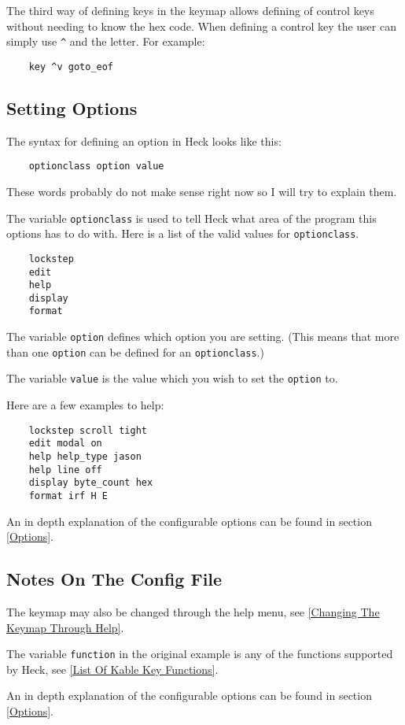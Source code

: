 \documentclass[12pt]{article}
\begin{document}
The third way of defining keys in the keymap allows defining of control keys
without needing to know the hex code.  When defining a control key the user
can simply use \verb#^# and the letter.  For example:
\begin{verbatim}
    key ^v goto_eof 
\end{verbatim}

\subsection{Setting Options}
The syntax for defining an option in Heck looks like this:
\begin{verbatim}
    optionclass option value
\end{verbatim}

These words probably do not make sense right now so I will try to explain them.

The variable \verb#optionclass# is used to tell Heck what area of the program
this options has to do with. Here is a list of the valid values for 
\verb#optionclass#. 
\begin{verbatim}
    lockstep
    edit
    help
    display
    format
\end{verbatim}

The variable \verb#option# defines which option you are setting.  (This means 
that more than one \verb#option# can be defined for an \verb#optionclass#.) 

The variable \verb#value# is the value which you wish to set the \verb#option#
to.  

Here are a few examples to help:
\begin{verbatim}
    lockstep scroll tight
    edit modal on
    help help_type jason
    help line off
    display byte_count hex
    format irf H E
\end{verbatim}

An in depth explanation of the configurable options can be found in section \ref{Options}.

\subsection{Notes On The Config File}
\begin{list}{-}{}
\item The keymap may also be changed through the help menu, see \ref{Changing The Keymap Through Help}.

\item The variable \verb#function# in the original example is any of the 
functions supported by Heck, see \ref{List Of Kable Key Functions}.

\item An in depth explanation of the configurable options can be found in section \ref{Options}.
\end{list}
\end{document}
